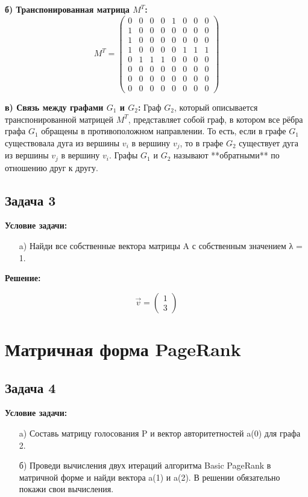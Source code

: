 \documentclass[a4paper,12pt]{article}
\begin{document}
\textbf{б) Транспонированная матрица \( M^T \):}
\[
M^T = \begin{pmatrix}
0 & 0 & 0 & 0 & 1 & 0 & 0 & 0 \\
1 & 0 & 0 & 0 & 0 & 0 & 0 & 0 \\
1 & 0 & 0 & 0 & 0 & 0 & 0 & 0 \\
1 & 0 & 0 & 0 & 0 & 1 & 1 & 1 \\
0 & 1 & 1 & 1 & 0 & 0 & 0 & 0 \\
0 & 0 & 0 & 0 & 0 & 0 & 0 & 0 \\
0 & 0 & 0 & 0 & 0 & 0 & 0 & 0 \\
0 & 0 & 0 & 0 & 0 & 0 & 0 & 0
\end{pmatrix}
\]

\textbf{в) Связь между графами \( G_1 \) и \( G_2 \):}
Граф \( G_2 \), который описывается транспонированной матрицей \( M^T \), представляет собой граф, в котором все рёбра графа \( G_1 \) обращены в противоположном направлении. То есть, если в графе \( G_1 \) существовала дуга из вершины \( v_i \) в вершину \( v_j \), то в графе \( G_2 \) существует дуга из вершины \( v_j \) в вершину \( v_i \). Графы \( G_1 \) и \( G_2 \) называют **обратными** по отношению друг к другу.


\subsection{Задача 3}
\textbf{Условие задачи:}
\begin{itemize}
    \item[a)] Найди все собственные вектора матрицы A с собственным значением λ = 1.
\end{itemize}

\textbf{Решение:}

  \[
   \vec{v} = \begin{pmatrix} 1 \\ 3 \end{pmatrix}
   \]

\vspace{1cm}

\section{Матричная форма PageRank}

\subsection{Задача 4}
\textbf{Условие задачи:}
\begin{itemize}
    \item[a)] Составь матрицу голосования P и вектор авторитетностей a(0) для графа 2.
    \item[б)] Проведи вычисления двух итераций алгоритма Basic PageRank в матричной форме и найди вектора a(1) и a(2). В решении обязательно покажи свои вычисления.
\end{itemize}
\end{document}
